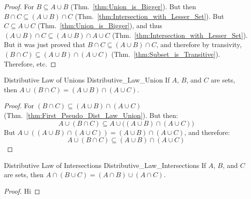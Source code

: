 \documentclass[crop=false,class=book,oneside]{standalone}
\begin{document}
            \begin{proof}
                For $B\subseteq{A}\cup{B}$
                (Thm.~\ref{thm:Union_is_Bigger}). But then
                $B\cap{C}\subseteq(A\cup{B})\cap{C}$
                (Thm.~\ref{thm:Intersection_with_Lesser_Set}).
                But $C\subseteq{A}\cup{C}$
                (Thm.~\ref{thm:Union_is_Bigger}), and thus
                $(A\cup{B})\cap{C}%
                 \subseteq(A\cup{B})\cap{A}\cup{C}$
                (Thm.~\ref{thm:Intersection_with_Lesser_Set}).
                But it was just proved that
                $B\cap{C}\subseteq(A\cup{B})\cap{C}$, and
                therefore by transivity,
                $(B\cap{C})\subseteq(A\cup{B})\cap(A\cup{C})$
                (Thm.~\ref{thm:Subset_is_Transitive}).
                Therefore, etc.
            \end{proof}
            \newpage
            \begin{ltheorem}{Distributive Law of Unions}
                  {Distributive_Law_Union}
                If $A$, $B$, and $C$ are sets, then
                $A\cup(B\cap{C})=(A\cup{B})\cap(A\cup{C})$.
            \end{ltheorem}
            \begin{proof}
                For $(B\cap{C})\subseteq(A\cup{B})\cap(A\cup{C})$
                (Thm.~\ref{thm:First_Pseudo_Dist_Law_Union}).
                But then:
                \begin{equation}
                    A\cup(B\cap{C})\subseteq
                    A\cup\Big((A\cup{B})\cap(A\cup{C})\Big)
                \end{equation}
                But $A\cup((A\cup{B})\cap(A\cup{C}))%
                     =(A\cup{B})\cap(A\cup{C})$, and therefore:
                \begin{equation}
                    A\cup(B\cap{C})\subseteq
                    (A\cup{B})\cap(A\cup{C})
                \end{equation}
            \end{proof}
            \begin{ltheorem}{Distributive Law of Intersections}
                  {Distributive_Law_Intersections}
                If $A$, $B$, and $C$ are sets, then
                $A\cap(B\cup{C})=(A\cap{B})\cup(A\cap{C})$.
            \end{ltheorem}
            \begin{proof}
                Hi
            \end{proof}
\end{document}
